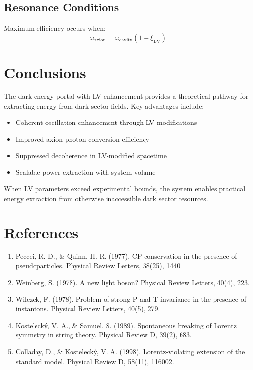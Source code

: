 \documentclass[11pt]{article}
\begin{document}
\subsection{Resonance Conditions}

Maximum efficiency occurs when:
\begin{equation}
\omega_{\text{axion}} = \omega_{\text{cavity}} \left(1 + \xi_{\text{LV}}\right)
\end{equation}

\section{Conclusions}

The dark energy portal with LV enhancement provides a theoretical pathway for extracting energy from dark sector fields. Key advantages include:

\begin{itemize}
\item Coherent oscillation enhancement through LV modifications
\item Improved axion-photon conversion efficiency
\item Suppressed decoherence in LV-modified spacetime
\item Scalable power extraction with system volume
\end{itemize}

When LV parameters exceed experimental bounds, the system enables practical energy extraction from otherwise inaccessible dark sector resources.

\section*{References}

\begin{enumerate}
\item Peccei, R. D., \& Quinn, H. R. (1977). CP conservation in the presence of pseudoparticles. Physical Review Letters, 38(25), 1440.
\item Weinberg, S. (1978). A new light boson? Physical Review Letters, 40(4), 223.
\item Wilczek, F. (1978). Problem of strong P and T invariance in the presence of instantons. Physical Review Letters, 40(5), 279.
\item Kosteleck\'y, V. A., \& Samuel, S. (1989). Spontaneous breaking of Lorentz symmetry in string theory. Physical Review D, 39(2), 683.
\item Colladay, D., \& Kosteleck\'y, V. A. (1998). Lorentz-violating extension of the standard model. Physical Review D, 58(11), 116002.
\end{enumerate}
\end{document}
